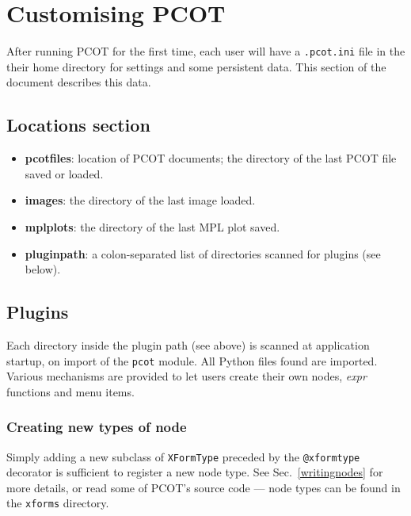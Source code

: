 

\section{Customising PCOT}
\label{customisation}
After running PCOT for the first time, each user will have a
\texttt{.pcot.ini} file in the their home directory for settings
and some persistent data. This
section of the document describes this data.

\subsection{Locations section}
\begin{itemize}
\item \textbf{pcotfiles}: location of PCOT documents; the directory
of the last PCOT file saved or loaded.
\item \textbf{images}: the directory of the last image loaded.
\item \textbf{mplplots}: the directory of the last MPL plot saved.
\item \textbf{pluginpath}: a colon-separated list of directories
scanned for plugins (see below).
\end{itemize}

\subsection{Plugins}
Each directory inside the plugin path (see above) is scanned at
application startup, on import of the \texttt{pcot} module. All
Python files found are imported. Various mechanisms are provided
to let users create their own nodes, \emph{expr} functions and
menu items.

\subsubsection{Creating new types of node}
Simply adding a new subclass of \texttt{XFormType} preceded by
the \texttt{@xformtype} decorator is sufficient to register
a new node type. See Sec.~\ref{writingnodes} for more details,
or read some of PCOT's source code --- node types can be found
in the \texttt{xforms} directory.

